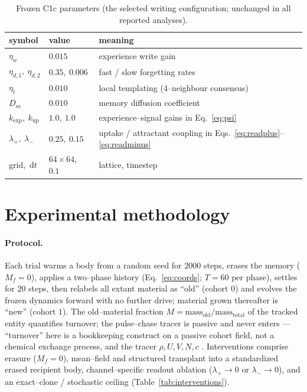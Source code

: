 \documentclass[11pt]{article}
\begin{document}
\begin{table}[t]\centering\small
\caption{Frozen C1c parameters (the selected writing configuration; unchanged in all reported analyses).}
\label{tab:params}
\begin{tabular}{@{}lll@{}}\toprule
symbol & value & meaning\\\midrule
$\eta_w$ & $0.015$ & experience write gain\\
$\eta_{d,1},\ \eta_{d,2}$ & $0.35,\ 0.006$ & fast / slow forgetting rates\\
$\eta_t$ & $0.010$ & local templating (4--neighbour consensus)\\
$D_m$ & $0.010$ & memory diffusion coefficient\\
$k_{\exp},\ k_{\mathrm{up}}$ & $1.0,\ 1.0$ & experience--signal gains in Eq.~\eqref{eq:psi}\\
$\lambda_+,\ \lambda_-$ & $0.25,\ 0.15$ & uptake / attractant coupling in Eqs.~\eqref{eq:readplus}--\eqref{eq:readminus}\\
grid,\ $\mathrm{d}t$ & $64\times64$,\ $0.1$ & lattice, timestep\\\bottomrule
\end{tabular}
\end{table}

\section{Experimental methodology}
\label{sec:methods}
\paragraph{Protocol.} Each trial warms a body from a random seed for $2000$ steps, erases the memory
($M_f=0$), applies a two--phase history (Eq.~\ref{eq:coords}; $T=60$ per phase), settles for $20$ steps, then
relabels all extant material as ``old'' (cohort $0$) and evolves the frozen dynamics forward with no further
drive; material grown thereafter is ``new'' (cohort $1$). The old--material fraction
$M=\text{mass}_{\text{old}}/\text{mass}_{\text{total}}$ of the tracked entity quantifies turnover; the pulse--chase
tracer is passive and never enters --- ``turnover'' here is a bookkeeping construct on a passive cohort field, not a chemical exchange process, and the tracer $\rho,U,V,N,c$ \citep{jaqaman2008}. Interventions comprise erasure ($M_f=0$),
mean--field and structured transplant into a standardized erased recipient body, channel--specific readout ablation
($\lambda_+\!\to\!0$ or $\lambda_-\!\to\!0$), and an exact--clone / stochastic ceiling (Table~\ref{tab:interventions}).
\end{document}
